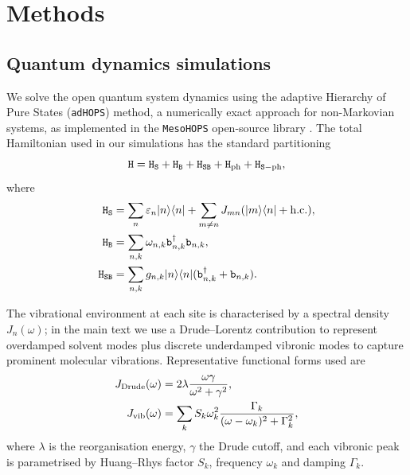 \documentclass[aps,prb,onecolumn,superscriptaddress,notitlepage,nofootinbib,longbibliography,10pt]{revtex4-2}
\begin{document}
\section{Methods}\label{sec:Methods}

\subsection{Quantum dynamics simulations}\label{sec:QDyn-sim}

We solve the open quantum system dynamics using the adaptive Hierarchy of Pure States (\texttt{adHOPS}) method, a numerically exact approach for non-Markovian systems, as implemented in the \texttt{MesoHOPS} open-source library \cite{Citty2024, Varvelo2021}. The total Hamiltonian used in our simulations has the standard partitioning
\begin{equation}
\mathtt{H} = \mathtt{H_S} + \mathtt{H_B} + \mathtt{H_{SB}} + \mathtt{H_{\rm ph}} + \mathtt{H_{S-\rm ph}},
\end{equation}
where
\begin{align}
\mathtt{H_S} &= \sum_n \varepsilon_n |n\rangle\langle n| + \sum_{m\neq n} J_{mn} (|m\rangle\langle n| + {\rm h.c.}), \\
\mathtt{H_B} &= \sum_{n,k} \omega_{n,k} \mathtt{b}_{n,k}^\dagger \mathtt{b}_{n,k}, \\
\mathtt{H_{SB}} &= \sum_{n,k} g_{n,k} |n\rangle\langle n| (\mathtt{b}_{n,k}^\dagger + \mathtt{b}_{n,k}).
\end{align}

The vibrational environment at each site is characterised by a spectral density $J_n(\omega)$; in the main text we use a Drude–Lorentz contribution to represent overdamped solvent modes plus discrete underdamped vibronic modes to capture prominent molecular vibrations. Representative functional forms used are
\begin{align}
J_{\rm Drude}(\omega) &= 2\lambda \frac{\omega \gamma}{\omega^2+\gamma^2}, \\
J_{\rm vib}(\omega) &= \sum_k S_k \omega_k^2 \frac{\Gamma_k}{(\omega-\omega_k)^2 + \Gamma_k^2},
\end{align}
where $\lambda$ is the reorganisation energy, $\gamma$ the Drude cutoff, and each vibronic peak is parametrised by Huang–Rhys factor $S_k$, frequency $\omega_k$ and damping $\Gamma_k$.
\end{document}
